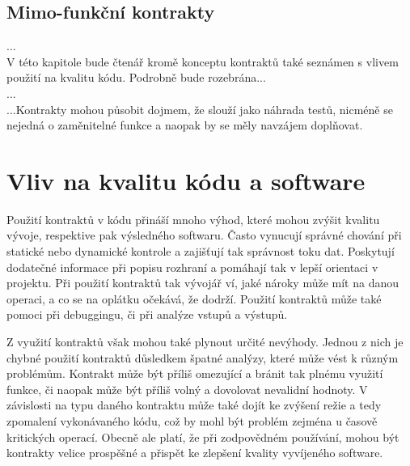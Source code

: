 		\subsection{Mimo-funkční kontrakty}
		
		
		...\\
		
		V této kapitole bude čtenář kromě konceptu kontraktů také seznámen s vlivem použití na kvalitu kódu. Podrobně bude rozebrána...\\
		
		...\\
		
		...Kontrakty mohou působit dojmem, že slouží jako náhrada testů, nicméně se nejedná o zaměnitelné funkce a naopak by se měly navzájem doplňovat.
		
	\section{Vliv na kvalitu kódu a software}
		Použití kontraktů v kódu přináší mnoho výhod, které mohou zvýšit kvalitu vývoje, respektive pak výsledného softwaru. Často vynucují správné chování při statické nebo dynamické kontrole a zajišťují tak správnost toku dat. Poskytují dodatečné informace při popisu rozhraní a pomáhají tak v lepší orientaci v projektu. Při použití kontraktů tak vývojář ví, jaké nároky může mít na danou operaci, a co se na oplátku očekává, že dodrží. Použití kontraktů může také pomoci při debuggingu, či při analýze vstupů a výstupů. 
		
		Z využití kontraktů však mohou také plynout určité nevýhody. Jednou z nich je chybné použití kontraktů důsledkem špatné analýzy, které může vést k různým problémům. Kontrakt  může být příliš omezující a bránit tak plnému využití funkce, či naopak může být příliš volný a dovolovat nevalidní hodnoty. V závislosti na typu daného kontraktu může také dojít ke zvýšení režie a tedy zpomalení vykonávaného kódu, což by mohl být problém zejména u časově kritických operací. Obecně ale platí, že při zodpovědném používání, mohou být kontrakty velice prospěšné a přispět ke zlepšení kvality vyvíjeného software.
	
